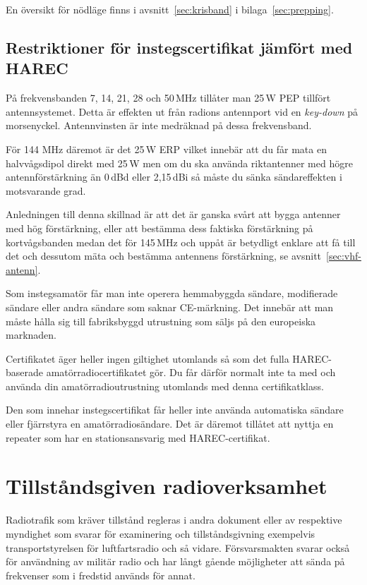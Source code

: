 En översikt för nödläge finns i avsnitt~\ref{sec:krisband} i
bilaga~\ref{sec:prepping}.

\subsection{Restriktioner för instegscertifikat jämfört med HAREC}
\label{sec:insteg-restriktioner}

På frekvensbanden 7, 14, 21, 28 och 50\,MHz tillåter man 25\,W PEP tillfört
antennsystemet. Detta är effekten ut från radions antennport vid en {\it
  key-down} på morsenyckel. Antennvinsten är inte medräknad på dessa
frekvensband.

För 144 MHz däremot är det 25\,W ERP vilket innebär att du får mata en
halvvågsdipol direkt med 25\,W men om du ska använda riktantenner med högre
antennförstärkning än 0\,dBd eller 2,15\,dBi så måste du sänka sändareffekten
i motsvarande grad.

Anledningen till denna skillnad är att det är ganska svårt att bygga antenner
med hög förstärkning, eller att bestämma dess faktiska förstärkning på
kortvågsbanden medan det för 145\,MHz och uppåt är betydligt enklare att få
till det och dessutom mäta och bestämma antennens förstärkning, se
avsnitt~\ref{sec:vhf-antenn}.

Som instegsamatör får man inte operera hemmabyggda sändare, modifierade
sändare eller andra sändare som saknar CE-märkning. Det innebär att man måste
hålla sig till fabriksbyggd utrustning som säljs på den europeiska marknaden.

Certifikatet äger heller ingen giltighet utomlands så som det fulla
HAREC-baserade amatörradiocertifikatet gör. Du får därför normalt inte ta med
och använda din amatörradioutrustning utomlands med denna certifikatklass.

Den som innehar instegscertifikat får heller inte använda automatiska sändare
eller fjärrstyra en amatörradiosändare. Det är däremot tillåtet att nyttja
en repeater som har en stationsansvarig med HAREC-certifikat.

\section{Tillståndsgiven radioverksamhet}

Radiotrafik som kräver tillstånd regleras i andra dokument eller av respektive
myndighet som svarar för examinering och tillståndsgivning exempelvis
transportstyrelsen för luftfartsradio och så vidare. Försvarsmakten svarar också
för användning av militär radio och har långt gående möjligheter att sända på
frekvenser som i fredstid används för annat.

